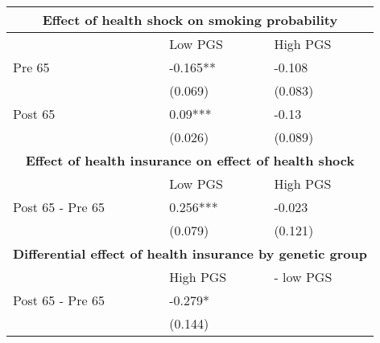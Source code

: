 % 
\begin{tabular}{lll}
  \toprule
  \multicolumn{3}{c}{ \textbf{Effect of health shock on smoking probability}} \\
 \midrule
 & Low PGS & High PGS \\ 
   \midrule
Pre 65 & -0.165** & -0.108 \\ 
   & (0.069) & (0.083) \\ 
  Post 65 & 0.09*** & -0.13 \\ 
   & (0.026) & (0.089) \\ 
   \toprule \multicolumn{3}{c}{ \textbf{Effect of health insurance on effect of health shock}} \\
 \midrule
 & Low PGS & High PGS \\ 
   \midrule
Post 65 - Pre 65 & 0.256*** & -0.023 \\ 
   & (0.079) & (0.121) \\ 
   \toprule \multicolumn{3}{c}{ \textbf{Differential effect of health insurance by genetic group}} \\
 \midrule
 & High PGS  & - low PGS \\ 
   \midrule
Post 65 - Pre 65 & -0.279* &  \\ 
   & (0.144) &  \\ 
   \bottomrule
\end{tabular}
